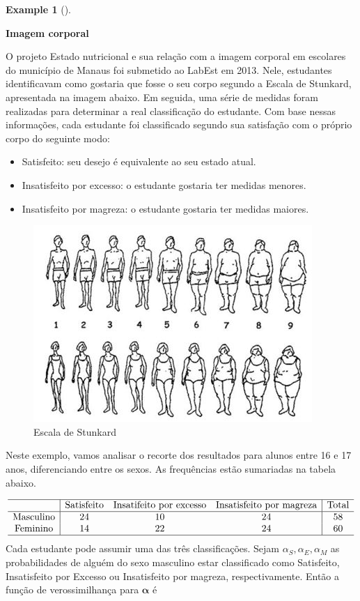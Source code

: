 \documentclass[
  letterpaper,
  DIV=11,
  numbers=noendperiod]{scrreprt}
\theoremstyle{definition}
\newtheorem{example}{Example}[chapter]
\theoremstyle{definition}
\theoremstyle{plain}
\theoremstyle{remark}
\begin{document}
\begin{example}[]\protect\hypertarget{exm-}{}\label{exm-}

\textbf{Imagem corporal}

O projeto Estado nutricional e sua relação com a imagem corporal em
escolares do município de Manaus foi submetido ao LabEst em 2013. Nele,
estudantes identificavam como gostaria que fosse o seu corpo segundo a
Escala de Stunkard, apresentada na imagem abaixo. Em seguida, uma série
de medidas foram realizadas para determinar a real classificação do
estudante. Com base nessas informações, cada estudante foi classificado
segundo sua satisfação com o próprio corpo do seguinte modo:

\begin{itemize}
\item
  Satisfeito: seu desejo é equivalente ao seu estado atual.
\item
  Insatisfeito por excesso: o estudante gostaria ter medidas menores.
\item
  Insatisfeito por magreza: o estudante gostaria ter medidas maiores.
\end{itemize}

\begin{figure}[H]

{\centering \includegraphics{percepcao-da-imagem-corporal-do-estudante-01.jpg}

}

\caption{Escala de Stunkard}

\end{figure}%

Neste exemplo, vamos analisar o recorte dos resultados para alunos entre
16 e 17 anos, diferenciando entre os sexos. As frequências estão
sumariadas na tabela abaixo.

\[\begin{array}{c|ccc|c}\hline
&\hbox{Satisfeito} & \hbox{Insatifeito por excesso} & \hbox{Insatisfeito por magreza} &\hbox{Total}\\ \hline
\hbox{Masculino} & 24 & 10 & 24 & 58 \\
\hbox{Feminino} & 14 & 22 & 24 & 60 \\ \hline
\end{array}
\] Cada estudante pode assumir uma das três classificações. Sejam
\(\alpha_S,\alpha_E,\alpha_M\) as probabilidades de alguém do sexo
masculino estar classificado como Satisfeito, Insatisfeito por Excesso
ou Insatisfeito por magreza, respectivamente. Então a função de
verossimilhança para \(\boldsymbol{\alpha}\) é


\end{example}
\end{document}
